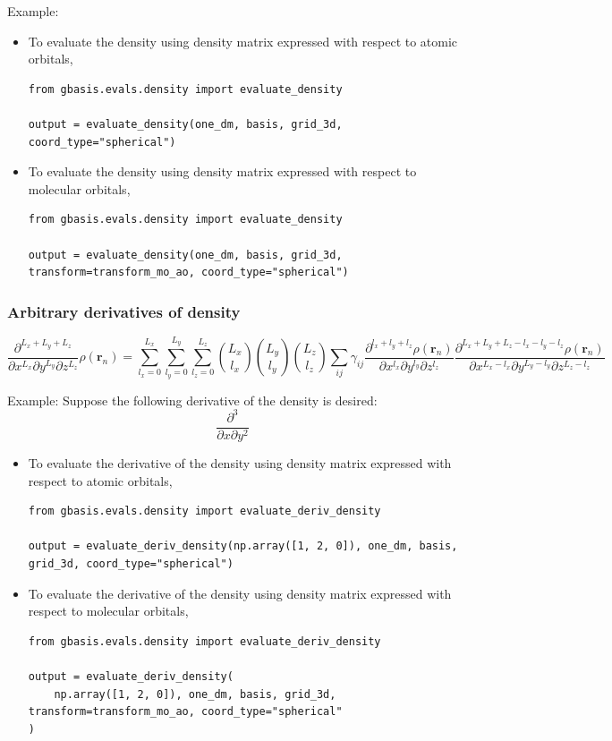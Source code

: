 \documentclass[letterpaper]{article}
\begin{document}
Example:
\begin{itemize}
\item To evaluate the density using density matrix expressed with respect to
  atomic orbitals,
  \begin{lstlisting}[xleftmargin=-25pt]
from gbasis.evals.density import evaluate_density

output = evaluate_density(one_dm, basis, grid_3d, coord_type="spherical")
\end{lstlisting}
\item To evaluate the density using density matrix expressed with respect to
  molecular orbitals,
  \begin{lstlisting}[xleftmargin=-25pt]
from gbasis.evals.density import evaluate_density

output = evaluate_density(one_dm, basis, grid_3d, transform=transform_mo_ao, coord_type="spherical")
\end{lstlisting}
\end{itemize}
\subsubsection{Arbitrary derivatives of density}
\begin{equation}
  \frac{\partial^{L_x + L_y + L_z}}{\partial x^{L_x} \partial y^{L_y} \partial z^{L_z}}
  \rho(\mathbf{r}_n)
  =
  \sum_{l_x=0}^{L_x} \sum_{l_y=0}^{L_y} \sum_{l_z=0}^{L_z}
  \binom{L_x}{l_x} \binom{L_y}{l_y} \binom{L_z}{l_z}
  \sum_{ij} \gamma_{ij}
  \frac{\partial^{l_x + l_y + l_z} \rho(\mathbf{r}_n)}{\partial x^{l_x} \partial y^{l_y} \partial z^{l_z}}
  \frac{
    \partial^{L_x + L_y + L_z - l_x - l_y - l_z} \rho(\mathbf{r}_n)
  }{
    \partial x^{L_x - l_x} \partial y^{L_y - l_y} \partial z^{L_z - l_z}
  }
\end{equation}

Example:
Suppose the following derivative of the density is desired:
\begin{equation}
  \frac{\partial^3}{\partial x \partial y^2}
\end{equation}
\begin{itemize}
\item To evaluate the derivative of the density using density matrix expressed
  with respect to atomic orbitals,
  \begin{lstlisting}[xleftmargin=-25pt]
from gbasis.evals.density import evaluate_deriv_density

output = evaluate_deriv_density(np.array([1, 2, 0]), one_dm, basis, grid_3d, coord_type="spherical")
\end{lstlisting}
\item To evaluate the derivative of the density using density matrix expressed
  with respect to molecular orbitals,
\begin{lstlisting}
from gbasis.evals.density import evaluate_deriv_density

output = evaluate_deriv_density(
    np.array([1, 2, 0]), one_dm, basis, grid_3d, transform=transform_mo_ao, coord_type="spherical"
)
\end{lstlisting}
\end{itemize}
\end{document}
